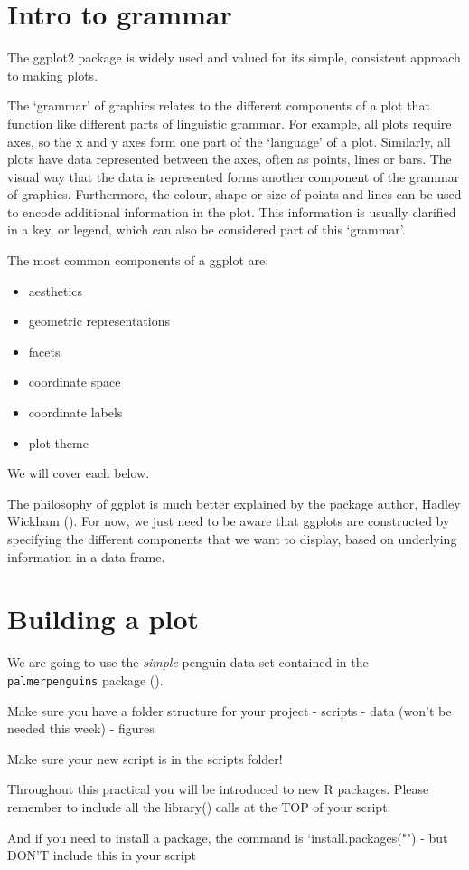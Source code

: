 \documentclass[
]{book}
\makeatletter
\newenvironment{kframe}{%
\medskip{}
\setlength{\fboxsep}{.8em}
 \def\at@end@of@kframe{}%
 \ifinner\ifhmode%
  \def\at@end@of@kframe{\end{minipage}}%
  \begin{minipage}{\columnwidth}%
 \fi\fi%
 \def\FrameCommand##1{\hskip\@totalleftmargin \hskip-\fboxsep
 \colorbox{shadecolor}{##1}\hskip-\fboxsep
     \hskip-\linewidth \hskip-\@totalleftmargin \hskip\columnwidth}%
 \MakeFramed {\advance\hsize-\width
   \@totalleftmargin\z@ \linewidth\hsize
   \@setminipage}}%
 {\par\unskip\endMakeFramed%
 \at@end@of@kframe}
\newenvironment{block}[1]
  {
  \begin{itemize}
  \renewcommand{\labelitemi}{
    \raisebox{-.7\height}[0pt][0pt]{
      {\setkeys{Gin}{width=3em,keepaspectratio}\texttt{[image: images/\#1]}}
    }
  }
  \setlength{\fboxsep}{1em}
  \begin{kframe}
  \item
  }
  {
  \end{kframe}
  \end{itemize}
  }
\newenvironment{rmdwarning}
  {\begin{block}{warning}}
  {\end{block}}
\makeatother
\begin{document}
\hypertarget{intro-to-grammar}{%
\section{Intro to grammar}\label{intro-to-grammar}}

The ggplot2 package is widely used and valued for its simple, consistent approach to making plots.

The `grammar' of graphics relates to the different components of a plot that function like different parts of linguistic grammar. For example, all plots require axes, so the x and y axes form one part of the `language' of a plot. Similarly, all plots have data represented between the axes, often as points, lines or bars. The visual way that the data is represented forms another component of the grammar of graphics. Furthermore, the colour, shape or size of points and lines can be used to encode additional information in the plot. This information is usually clarified in a key, or legend, which can also be considered part of this `grammar'.

The most common components of a ggplot are:

\begin{itemize}
\item
  aesthetics
\item
  geometric representations
\item
  facets
\item
  coordinate space
\item
  coordinate labels
\item
  plot theme
\end{itemize}

We will cover each below.

The philosophy of ggplot is much better explained by the package author, Hadley Wickham (\citet{R-ggplot2}). For now, we just need to be aware that ggplots are constructed by specifying the different components that we want to display, based on underlying information in a data frame.

\hypertarget{building-a-plot}{%
\section{Building a plot}\label{building-a-plot}}

We are going to use the \emph{simple} penguin data set contained in the \texttt{palmerpenguins} package (\citet{R-palmerpenguins}).

\begin{rmdwarning}
Make sure you have a folder structure for your project - scripts - data
(won't be needed this week) - figures

Make sure your new script is in the scripts folder!

Throughout this practical you will be introduced to new R packages.
Please remember to include all the library() calls at the TOP of your
script.

And if you need to install a package, the command is
`install.packages("") - but DON'T include this in your script
\end{rmdwarning}
\end{document}
